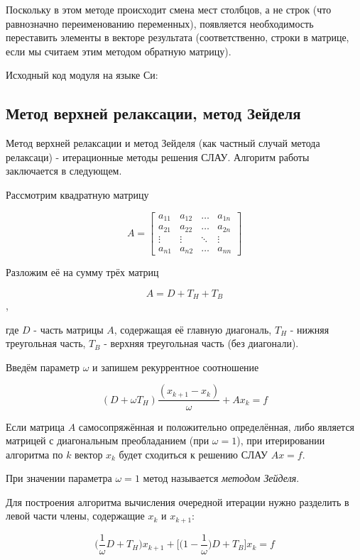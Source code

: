 \documentclass[a4paper,11pt]{report}
\begin{document}
Поскольку в этом методе происходит смена мест столбцов, а не строк (что равнозначно переименованию переменных), появляется
необходимость переставить элементы в векторе результата (соответственно, строки в матрице, если мы считаем этим методом обратную
матрицу).

Исходный код модуля на языке Си:
~\\




\subsection*{Метод верхней релаксации, метод Зейделя}
Метод верхней релаксации и метод Зейделя (как частный случай метода релаксаци) - итерационные методы решения СЛАУ. Алгоритм 
работы заключается в следующем.

Рассмотрим квадратную матрицу 

$$
A = \begin{bmatrix}
 a_{11} & a_{12} & \hdots & a_{1n} \\
 a_{21} & a_{22} & \hdots & a_{2n} \\
 \vdots & \vdots & \ddots & \vdots \\
 a_{n1} & a_{n2} & \hdots & a_{nn}
\end{bmatrix}
$$

Разложим её на сумму трёх матриц

$$A = D + T_H + T_B$$,

где $D$ - часть матрицы $A$, содержащая её главную диагональ, $T_H$ - нижняя треугольная часть, $T_B$ - верхняя треугольная часть
(без диагонали).

Введём параметр $\omega$ и запишем рекуррентное соотношение

$$(D + \omega T_H)\frac{(x_{k+1} - x_k)}{\omega} + Ax_k = f$$

Если матрица $A$ самосопряжённая и положительно определённая, либо является матрицей с диагональным преобладанием (при $\omega = 1$),
при итерировании алгоритма по $k$ вектор $x_k$ будет сходиться к решению СЛАУ $Ax = f$.

При значении параметра $\omega = 1$ метод называется \textit{методом Зейделя}.

Для построения алгоритма вычисления очередной итерации нужно разделить в левой части члены, содержащие $x_k$ и $x_{k+1}$:

$$\bigg(\frac{1}{\omega}D + T_H\bigg)x_{k+1} + \Bigg[\bigg(1 - \frac{1}{\omega}\bigg)D + T_B\Bigg]x_k = f$$
\end{document}
